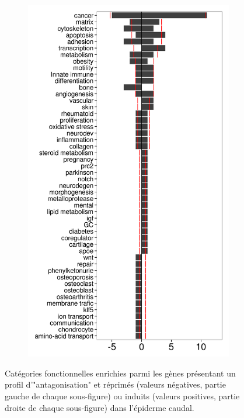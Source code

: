 \begin{figure}[!htbp]
\begin{subfigure}{0.49\textwidth}
	\includegraphics[width=\textwidth]
	{Figures/tfc-manualannot-antago/tfc-manualannot-antago-t.png}
	\caption{}
	\label{subfig:tfc-manualannot-antago-t}
\end{subfigure}
\caption[Catégories fonctionnelles enrichies parmi les gènes "antagonisés" dans l'épiderme caudal]
{
Catégories fonctionnelles enrichies parmi les gènes présentant un profil d'"antagonisation" et réprimés (valeurs négatives, partie gauche de chaque sous-figure) ou induits (valeurs positives, partie droite de chaque sous-figure) dans l'épiderme caudal.
}
\end{figure}
